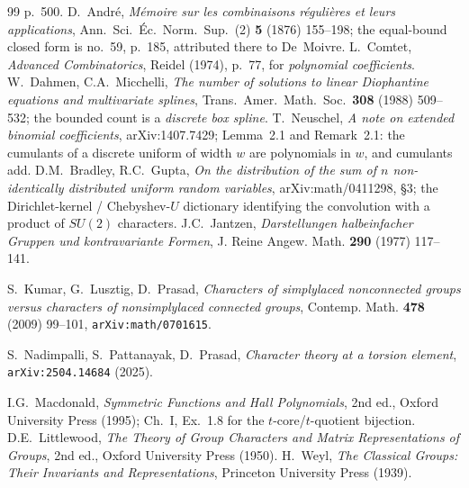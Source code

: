 \documentclass[11pt,a4paper]{article}
\begin{document}
\begin{thebibliography}{99}
p.~500.
 D.~Andr\'e, \emph{M\'emoire sur les combinaisons r\'eguli\`eres et leurs
applications}, Ann.\ Sci.\ \'Ec.\ Norm.\ Sup.\ (2) \textbf{5} (1876) 155--198; the
equal-bound closed form is no.~59, p.~185, attributed there to De~Moivre.
 L.~Comtet, \emph{Advanced Combinatorics}, Reidel (1974), p.~77, for
\emph{polynomial coefficients}.
 W.~Dahmen, C.A.~Micchelli, \emph{The number of solutions to linear
Diophantine equations and multivariate splines}, Trans.\ Amer.\ Math.\ Soc.\ \textbf{308}
(1988) 509--532; the bounded count is a \emph{discrete box spline}.
 T.~Neuschel, \emph{A note on extended binomial coefficients},
arXiv:1407.7429; Lemma~2.1 and Remark~2.1: the cumulants of a discrete uniform of width $w$ are
polynomials in $w$, and cumulants add.
 D.M.~Bradley, R.C.~Gupta, \emph{On the distribution of the sum of $n$
non-identically distributed uniform random variables}, arXiv:math/0411298, \S3; the
Dirichlet-kernel / Chebyshev-$U$ dictionary identifying the convolution with a product of
$SU(2)$ characters.
 J.C.~Jantzen, \emph{Darstellungen halbeinfacher Gruppen und kontravariante
Formen}, J. Reine Angew. Math. \textbf{290} (1977) 117--141.

 S.~Kumar, G.~Lusztig, D.~Prasad, \emph{Characters of simplylaced nonconnected groups
versus characters of nonsimplylaced connected groups}, Contemp. Math. \textbf{478} (2009) 99--101,
\texttt{arXiv:math/0701615}.

 S.~Nadimpalli, S.~Pattanayak, D.~Prasad, \emph{Character theory at a torsion
element}, \texttt{arXiv:2504.14684} (2025).

 I.G.~Macdonald, \emph{Symmetric Functions and Hall Polynomials}, 2nd ed.,
Oxford University Press (1995); Ch.~I, Ex.~1.8 for the $t$-core/$t$-quotient bijection.
 D.E.~Littlewood, \emph{The Theory of Group Characters and Matrix
Representations of Groups}, 2nd ed., Oxford University Press (1950).
 H.~Weyl, \emph{The Classical Groups: Their Invariants and Representations},
Princeton University Press (1939).
\end{thebibliography}
\end{document}
